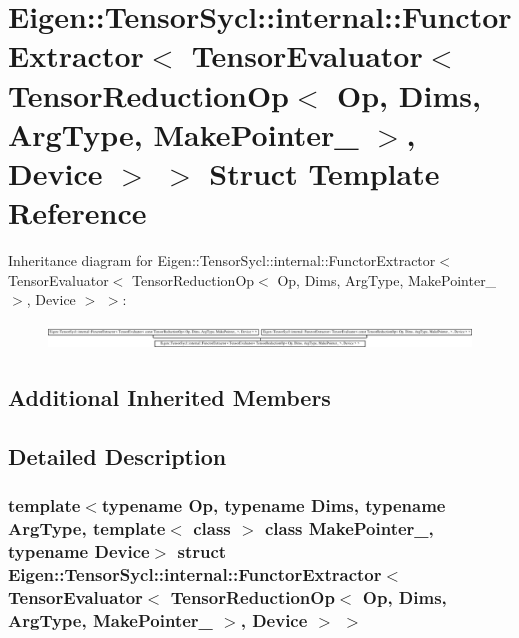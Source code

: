 \hypertarget{struct_eigen_1_1_tensor_sycl_1_1internal_1_1_functor_extractor_3_01_tensor_evaluator_3_01_tensor8c6d922b20ff2a8da717377cef7d5ede}{}\section{Eigen\+:\+:Tensor\+Sycl\+:\+:internal\+:\+:Functor\+Extractor$<$ Tensor\+Evaluator$<$ Tensor\+Reduction\+Op$<$ Op, Dims, Arg\+Type, Make\+Pointer\+\_\+ $>$, Device $>$ $>$ Struct Template Reference}
\label{struct_eigen_1_1_tensor_sycl_1_1internal_1_1_functor_extractor_3_01_tensor_evaluator_3_01_tensor8c6d922b20ff2a8da717377cef7d5ede}
Inheritance diagram for Eigen\+:\+:Tensor\+Sycl\+:\+:internal\+:\+:Functor\+Extractor$<$ Tensor\+Evaluator$<$ Tensor\+Reduction\+Op$<$ Op, Dims, Arg\+Type, Make\+Pointer\+\_\+ $>$, Device $>$ $>$\+:\begin{figure}[H]
\begin{center}
\leavevmode
\includegraphics[height=0.674699cm]{struct_eigen_1_1_tensor_sycl_1_1internal_1_1_functor_extractor_3_01_tensor_evaluator_3_01_tensor8c6d922b20ff2a8da717377cef7d5ede}
\end{center}
\end{figure}
\subsection*{Additional Inherited Members}


\subsection{Detailed Description}
\subsubsection*{template$<$typename Op, typename Dims, typename Arg\+Type, template$<$ class $>$ class Make\+Pointer\+\_\+, typename Device$>$\newline
struct Eigen\+::\+Tensor\+Sycl\+::internal\+::\+Functor\+Extractor$<$ Tensor\+Evaluator$<$ Tensor\+Reduction\+Op$<$ Op, Dims, Arg\+Type, Make\+Pointer\+\_\+ $>$, Device $>$ $>$}



